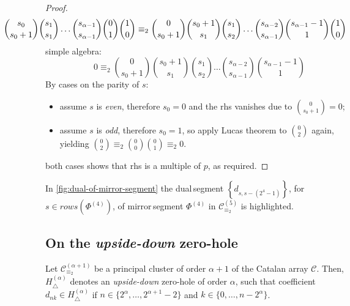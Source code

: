 \begin{proof}
    \begin{displaymath}
        \hspace{-2cm}
        {{s_{0}}\choose{s_{0}+1}}
        {{s_{1}}\choose{s_{1}}}
        \ldots
        {{s_{\alpha-1}}\choose{s_{\alpha-1}}}
        {{0}\choose{1}}
        {{1}\choose{0}}
        \equiv_{2}
        {{0}\choose{s_{0}+1}}
        {{s_{0}+1}\choose{s_{1}}}
        {{s_{1}}\choose{s_{2}}}
        \ldots
        {{s_{\alpha-2}}\choose{s_{\alpha-1}}}
        {{s_{\alpha-1}-1}\choose{1}}
        {{1}\choose{0}}
    \end{displaymath}
    simple algebra:
    \begin{displaymath}
        0
        \equiv_{2}
        {{0}\choose{s_{0}+1}}
        {{s_{0}+1}\choose{s_{1}}}
        {{s_{1}}\choose{s_{2}}}
        \ldots
        {{s_{\alpha-2}}\choose{s_{\alpha-1}}}
        {{s_{\alpha-1}-1}\choose{1}}
    \end{displaymath}
    By cases on the parity of $s$:
    \begin{itemize}
        \item assume $s$ is \emph{even}, therefore $s_{0}=0$ and the \ac{rhs} vanishes due to ${{0}\choose{s_{0}+1}}=0$;
        \item assume $s$ is \emph{odd}, therefore $s_{0}=1$, so apply Lucas theorem to ${{0}\choose{2}}$ again,
            yielding ${{0}\choose{2}}\equiv_{2}{{0}\choose{0}}{{0}\choose{1}}\equiv_{2}0$.
    \end{itemize}
    both cases shows that \ac{rhs} is a multiple of $p$, as required.
\end{proof}


In \autoref{fig:dual-of-mirror-segment} the \flqq dual\frqq\,segment 
    $\left\lbrace d_{s,s-(2^{4}-1)}\right\rbrace$,
    for $s\in rows\left(\Phi^{(4)}\right)$, of \flqq mirror\frqq\,segment 
    $\Phi^{(4)}$ in $\mathcal{C}_{\equiv_{2}}^{(5)}$ is highlighted.

\subsection{On the \emph{upside-down} zero-hole}

\begin{theorem}
    Let 
    $\mathcal{C}_{\equiv_{2}}^{(\alpha+1)}$ be a principal cluster 
    of order $\alpha+1$ of the Catalan array $\mathcal{C}$. Then, 
    $H_{\bigtriangleup}^{({\alpha})}$ denotes an \emph{upside-down} zero-hole of order $\alpha$,
    such that coefficient $d_{nk}\in H_{\bigtriangleup}^{({\alpha})}$ if 
    $n\in\lbrace 2^{{\alpha}},\ldots,2^{{\alpha}+1}-2\rbrace$ and 
    $k\in\lbrace 0,\ldots, n-2^{{\alpha}}\rbrace$. 
\end{theorem}


